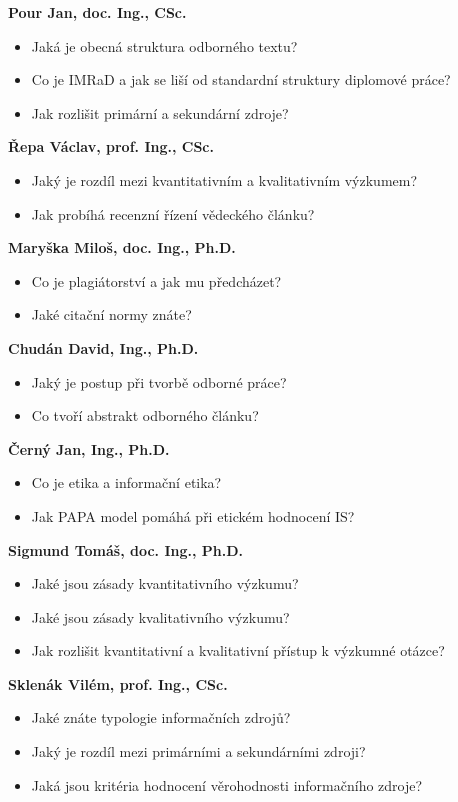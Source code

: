 \begin{profesorbox}
\textbf{Pour Jan, doc. Ing., CSc.}
\begin{itemize}
  \item Jaká je obecná struktura odborného textu?
  \item Co je IMRaD a jak se liší od standardní struktury diplomové práce?
  \item Jak rozlišit primární a sekundární zdroje?
\end{itemize}
\textbf{Řepa Václav, prof. Ing., CSc.}
\begin{itemize}
  \item Jaký je rozdíl mezi kvantitativním a kvalitativním výzkumem?
  \item Jak probíhá recenzní řízení vědeckého článku?
\end{itemize}
\textbf{Maryška Miloš, doc. Ing., Ph.D.}
\begin{itemize}
  \item Co je plagiátorství a jak mu předcházet?
  \item Jaké citační normy znáte?
\end{itemize}
\textbf{Chudán David, Ing., Ph.D.}
\begin{itemize}
  \item Jaký je postup při tvorbě odborné práce?
  \item Co tvoří abstrakt odborného článku?
\end{itemize}
\textbf{Černý Jan, Ing., Ph.D.}
\begin{itemize}
  \item Co je etika a informační etika?
  \item Jak PAPA model pomáhá při etickém hodnocení IS?
\end{itemize}
\textbf{Sigmund Tomáš, doc. Ing., Ph.D.}
\begin{itemize}
  \item Jaké jsou zásady kvantitativního výzkumu?
  \item Jaké jsou zásady kvalitativního výzkumu?
  \item Jak rozlišit kvantitativní a kvalitativní přístup k výzkumné otázce?
\end{itemize}
\textbf{Sklenák Vilém, prof. Ing., CSc.}
\begin{itemize}
  \item Jaké znáte typologie informačních zdrojů?
  \item Jaký je rozdíl mezi primárními a sekundárními zdroji?
  \item Jaká jsou kritéria hodnocení věrohodnosti informačního zdroje?
\end{itemize}
\end{profesorbox}
